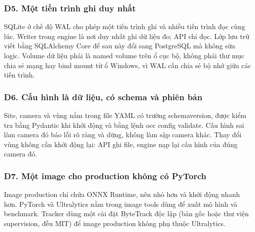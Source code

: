 \documentclass[10pt,a4paper,oneside,openany]{report}
\newcommand{\breakus}{\textunderscore\allowbreak}
\newcommand{\code}[1]{{\ttfamily\let\_\breakus #1}}
\begin{document}
\subsubsection{D5. Một tiến trình ghi duy nhất}
SQLite ở chế độ WAL cho phép một tiến trình ghi và nhiều tiến trình đọc cùng lúc. Writer trong engine là nơi duy nhất ghi dữ liệu đo;
API chỉ đọc. Lớp lưu trữ viết bằng SQLAlchemy Core để sau này đổi sang PostgreSQL mà không sửa logic. Volume dữ liệu phải là
named volume trên ổ cục bộ, không phải thư mục chia sẻ mạng hay bind mount từ ổ Windows, vì WAL cần chia sẻ bộ nhớ giữa các tiến trình.

\subsubsection{D6. Cấu hình là dữ liệu, có schema và phiên bản}
Site, camera và vùng nằm trong file YAML có trường \code{schema\_version}, được kiểm tra bằng Pydantic khi khởi động và bằng lệnh
\code{occ config validate}. Cấu hình sai làm camera đó báo lỗi rõ ràng và dừng, không làm sập camera khác. Thay đổi vùng không cần
khởi động lại: API ghi file, engine nạp lại cấu hình của đúng camera đó.

\subsubsection{D7. Một image cho production không có PyTorch}
Image production chỉ chứa ONNX Runtime, nên nhỏ hơn và khởi động nhanh hơn. PyTorch và Ultralytics nằm trong image \code{tools}
dùng để xuất mô hình và benchmark. Tracker dùng một cài đặt ByteTrack độc lập (bản gốc hoặc thư viện supervision, đều MIT) để image production không phụ thuộc Ultralytics.
\end{document}
